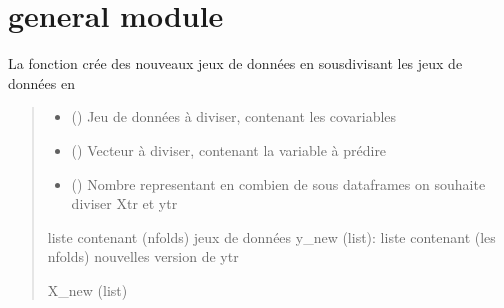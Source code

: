 \documentclass[letterpaper,10pt,french]{sphinxmanual}
\begin{document}
\sphinxstepscope


\chapter{general module}
\label{\detokenize{general:module-general}}\label{\detokenize{general:general-module}}\label{\detokenize{general::doc}}

\begin{fulllineitems}
\label{\detokenize{general:general.CV_rep}}
\pysigstartsignatures
{}
\pysigstopsignatures
\sphinxAtStartPar
La fonction crée des nouveaux jeux de données en sous\sphinxhyphen{}divisant les jeux de données en
\begin{quote}\begin{description}
\begin{itemize}
\item {} 
\sphinxAtStartPar
{} () \textendash{} Jeu de données à diviser, contenant les co\sphinxhyphen{}variables

\item {} 
\sphinxAtStartPar
{} () \textendash{} Vecteur à diviser, contenant la variable à prédire

\item {} 
\sphinxAtStartPar
{} () \textendash{} Nombre representant en combien de sous dataframes on souhaite diviser Xtr et ytr

\end{itemize}

\sphinxAtStartPar
liste contenant (n\sphinxhyphen{}folds) jeux de données
y\_new (list): liste contenant (les n\sphinxhyphen{}folds) nouvelles version de ytr

\sphinxAtStartPar
X\_new (list)

\end{description}\end{quote}

\end{fulllineitems}
\end{document}
